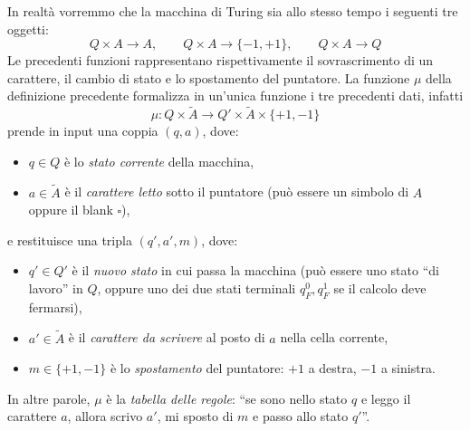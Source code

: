 In realtà  vorremmo che la macchina di Turing sia allo stesso tempo i seguenti tre oggetti:
\[
Q\times A \to A, \qquad Q\times A \to \{-1,+1\}, \qquad Q \times A \to Q
\]
Le precedenti funzioni rappresentano rispettivamente il sovrascrimento di un carattere, il cambio di stato e lo spostamento del puntatore.
La funzione $\mu$ della definizione precedente formalizza in un'unica funzione i tre precedenti dati, infatti
\[
\mu : Q \times \tilde{A} \to Q' \times \tilde{A} \times \{+1,-1\}
\]
prende in input una coppia $(q,a)$, dove:
\begin{itemize}
\item $q \in Q$ è lo \textit{stato corrente} della macchina,
\item $a \in \tilde{A}$ è il \textit{carattere letto} sotto il puntatore (può essere un simbolo di $A$ oppure il blank $\square$),
\end{itemize}
e restituisce una tripla $(q', a', m)$, dove:
\begin{itemize}
\item $q' \in Q'$ è il \textit{nuovo stato} in cui passa la macchina (può essere uno stato ``di lavoro'' in $Q$, oppure uno dei due stati terminali $q_F^0, q_F^1$ se il calcolo deve fermarsi),
\item $a' \in \tilde{A}$ è il \textit{carattere da scrivere} al posto di $a$ nella cella corrente,
\item $m \in \{+1,-1\}$ è lo \textit{spostamento} del puntatore: $+1$ a destra, $-1$ a sinistra.
\end{itemize}
In altre parole, $\mu$ è la \emph{tabella delle regole}: ``se sono nello stato $q$ e leggo il carattere $a$, allora scrivo $a'$, mi sposto di $m$ e passo allo stato $q'$''. 


